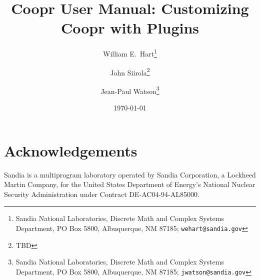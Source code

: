 \documentclass[12pt]{book}
\begin{document}
\title{Coopr User Manual: Customizing Coopr with Plugins}

\author{William E.\ Hart\footnote{Sandia National Laboratories, Discrete
Math and Complex Systems Department, PO Box 5800, Albuquerque, NM 87185;
{\tt wehart@sandia.gov}}
\and
John Siirola\footnote{TBD}
\and
Jean-Paul Watson\footnote{Sandia National Laboratories, Discrete
Math and Complex Systems Department, PO Box 5800, Albuquerque, NM 87185;
{\tt jwatson@sandia.gov}}
}

\date{\today}

\maketitle

\lstset{language=Python}
\lstset{aboveskip=1em,belowskip=1em,showspaces=false,showstringspaces=false}

\tableofcontents






\section*{Acknowledgements} 

Sandia is a multiprogram laboratory
operated by Sandia Corporation, a Lockheed Martin Company, for the United
States Department of Energy's National Nuclear Security Administration
under Contract DE-AC04-94-AL85000.




\end{document}
